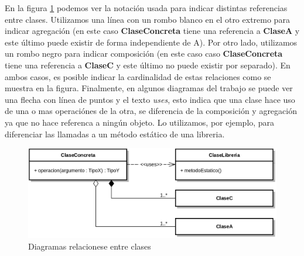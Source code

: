 En la figura \ref{fig:png_arquitectura} podemos ver la notación usada para indicar distintas referencias entre clases. Utilizamos una línea con un rombo blanco en el otro extremo para indicar agregación (en este caso \textbf{ClaseConcreta} tiene una referencia a \textbf{ClaseA} y este último puede existir de forma independiente de A). Por otro lado, utilizamos un rombo negro para indicar composición (en este caso caso \textbf{ClaseConcreta} tiene una referencia a \textbf{ClaseC} y este último no puede existir por separado). En ambos casos, es posible indicar la cardinalidad de estas relaciones como se muestra en la figura. Finalmente, en algunos diagramas del trabajo se puede ver una flecha con línea de puntos y el texto \emph{uses}, esto indica que una clase hace uso de una o mas operaciónes de la otra, se diferencia de la composición y agregación ya que no hace referenca a ningún objeto. Lo utilizamos, por ejemplo, para diferenciar las llamadas a un método estático de una libreria.

\begin{figure}[H]
  	\centering
	\includegraphics[scale=0.17]{img/ref_comp-agregation.png}
	\caption{Diagramas relacionese entre clases}
  	\label{fig:png_arquitectura}
\end{figure}


